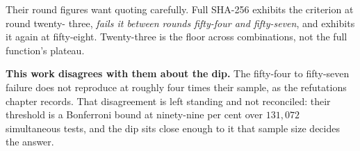 Their round figures want quoting carefully. Full SHA-256 exhibits the criterion at round twenty-
three, \emph{fails it between rounds fifty-four and fifty-seven}, and exhibits it again at
fifty-eight. Twenty-three is the floor across combinations, not the full function's plateau.

\textbf{This work disagrees with them about the dip.} The fifty-four to fifty-seven failure does not
reproduce at roughly four times their sample, as the refutations chapter records. That disagreement
is left standing and not reconciled: their threshold is a Bonferroni bound at ninety-nine per cent
over \(131{,}072\) simultaneous tests, and the dip sits close enough to it that sample size decides
the answer.
